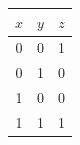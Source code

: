 \begin{tabular}{ccc}\toprule
\(x\)&\(y\)&\(z\)\\\midrule
0&0&1\\
0&1&0\\
1&0&0\\
1&1&1\\
\bottomrule\end{tabular}
